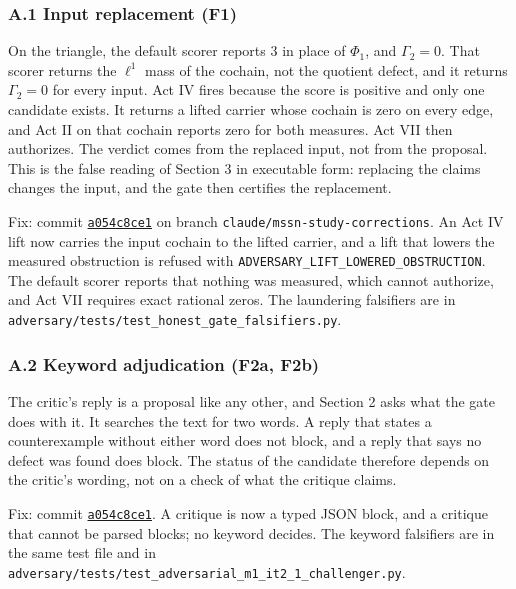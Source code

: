 \documentclass[
  11pt,
]{article}
\newcommand{\passthrough}[1]{#1}
\begin{document}
\subsubsection{A.1 Input replacement
(F1)}\label{a.1-input-replacement-f1}

On the triangle, the default scorer reports 3 in place of \(\Phi_1\),
and \(\Gamma_2 = 0\). That scorer returns the \(\ell^1\) mass of the
cochain, not the quotient defect, and it returns \(\Gamma_2 = 0\) for
every input. Act IV fires because the score is positive and only one
candidate exists. It returns a lifted carrier whose cochain is zero on
every edge, and Act II on that cochain reports zero for both measures.
Act VII then authorizes. The verdict comes from the replaced input, not
from the proposal. This is the false reading of Section 3 in executable
form: replacing the claims changes the input, and the gate then
certifies the replacement.

Fix: commit
\href{https://github.com/dbccpage/the_symbol_game/commit/a054c8ce17c3025ac5518aaeef29096a299519bb}{\passthrough{\lstinline!a054c8ce1!}}
on branch \nolinkurl{claude/mssn-study-corrections}. An Act IV lift now
carries the input cochain to the lifted carrier, and a lift that lowers
the measured obstruction is refused with
\nolinkurl{ADVERSARY_LIFT_LOWERED_OBSTRUCTION}. The default scorer reports
that nothing was measured, which cannot authorize, and Act VII requires
exact rational zeros. The laundering falsifiers are in
\nolinkurl{adversary/tests/test_honest_gate_falsifiers.py}.

\subsubsection{A.2 Keyword adjudication (F2a,
F2b)}\label{a.2-keyword-adjudication-f2a-f2b}

The critic's reply is a proposal like any other, and Section 2 asks what
the gate does with it. It searches the text for two words. A reply that
states a counterexample without either word does not block, and a reply
that says no defect was found does block. The status of the candidate
therefore depends on the critic's wording, not on a check of what the
critique claims.

Fix: commit
\href{https://github.com/dbccpage/the_symbol_game/commit/a054c8ce17c3025ac5518aaeef29096a299519bb}{\passthrough{\lstinline!a054c8ce1!}}.
A critique is now a typed JSON block, and a critique that cannot be
parsed blocks; no keyword decides. The keyword falsifiers are in the
same test file and in
\nolinkurl{adversary/tests/test_adversarial_m1_it2_1_challenger.py}.
\end{document}
